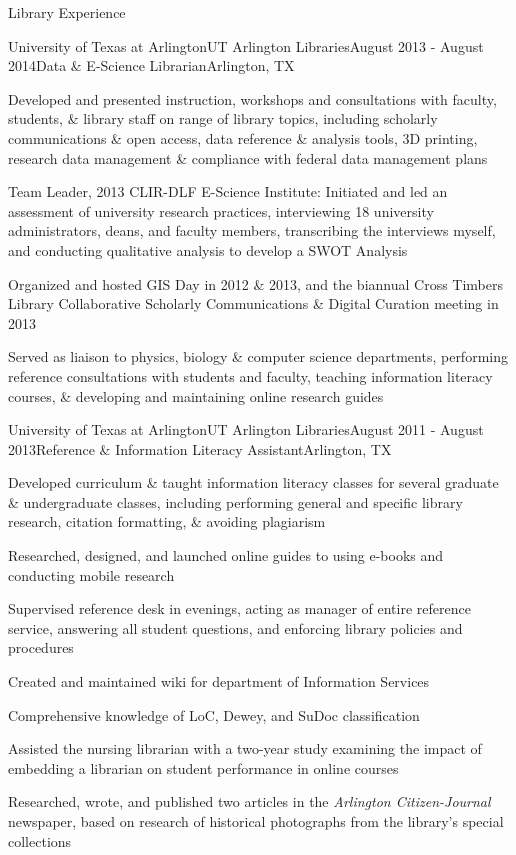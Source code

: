 \documentclass{resume} %
\begin{document}
\begin{rSection}{Library Experience}
\begin{rSubsection}{University of Texas at Arlington}{UT Arlington Libraries}{August 2013 - August 2014}{Data \& E-Science Librarian}{Arlington, TX}
\item Developed and presented instruction, workshops and consultations with faculty, students, \& library staff on range of library topics, including scholarly communications \& open access, data reference \& analysis tools, 3D printing, research data management \& compliance with federal data management plans
\item Team Leader, 2013 CLIR-DLF E-Science Institute: Initiated and led an assessment of university research practices, interviewing 18 university administrators, deans, and faculty members, transcribing the interviews myself, and conducting qualitative analysis to develop a SWOT Analysis
\item Organized and hosted GIS Day in 2012 \& 2013, and the biannual Cross Timbers Library Collaborative Scholarly Communications \& Digital Curation meeting in 2013
\item Served as liaison to physics, biology \& computer science departments, performing reference consultations with students and faculty, teaching information literacy courses, \& developing and maintaining online research guides

\end{rSubsection}


\begin{rSubsection}{University of Texas at Arlington}{UT Arlington Libraries}{August 2011 - August 2013}{Reference  \& Information Literacy Assistant}{Arlington, TX}
\item Developed curriculum \& taught information literacy classes for several graduate \& undergraduate classes, including performing general and specific library research, citation formatting, \& avoiding plagiarism
\item Researched, designed, and launched online guides to using e-books and conducting mobile research
\item Supervised reference desk in evenings, acting as manager of entire reference service, answering all student questions, and enforcing library policies and procedures
\item Created and maintained wiki for department of Information Services
\item Comprehensive knowledge of LoC, Dewey, and SuDoc classification
\item Assisted the nursing librarian with a two-year study examining the impact of embedding a librarian on student performance in online courses
\item Researched, wrote, and published two articles in the \textit{Arlington Citizen-Journal} newspaper, based on research of historical photographs from the library's special collections
\end{rSubsection}


\end{rSection}
\end{document}
